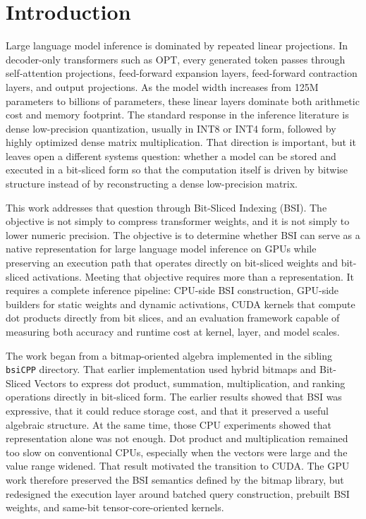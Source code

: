 \section{Introduction}\label{sec:introduction}
Large language model inference is dominated by repeated linear projections. In decoder-only transformers such as OPT, every generated token passes through self-attention projections, feed-forward expansion layers, feed-forward contraction layers, and output projections. As the model width increases from 125M parameters to billions of parameters, these linear layers dominate both arithmetic cost and memory footprint. The standard response in the inference literature is dense low-precision quantization, usually in INT8 or INT4 form, followed by highly optimized dense matrix multiplication. That direction is important, but it leaves open a different systems question: whether a model can be stored and executed in a bit-sliced form so that the computation itself is driven by bitwise structure instead of by reconstructing a dense low-precision matrix.

This work addresses that question through Bit-Sliced Indexing (BSI). The objective is not simply to compress transformer weights, and it is not simply to lower numeric precision. The objective is to determine whether BSI can serve as a native representation for large language model inference on GPUs while preserving an execution path that operates directly on bit-sliced weights and bit-sliced activations. Meeting that objective requires more than a representation. It requires a complete inference pipeline: CPU-side BSI construction, GPU-side builders for static weights and dynamic activations, CUDA kernels that compute dot products directly from bit slices, and an evaluation framework capable of measuring both accuracy and runtime cost at kernel, layer, and model scales.

The work began from a bitmap-oriented algebra implemented in the sibling \texttt{bsiCPP} directory. That earlier implementation used hybrid bitmaps and Bit-Sliced Vectors to express dot product, summation, multiplication, and ranking operations directly in bit-sliced form. The earlier results showed that BSI was expressive, that it could reduce storage cost, and that it preserved a useful algebraic structure. At the same time, those CPU experiments showed that representation alone was not enough. Dot product and multiplication remained too slow on conventional CPUs, especially when the vectors were large and the value range widened. That result motivated the transition to CUDA. The GPU work therefore preserved the BSI semantics defined by the bitmap library, but redesigned the execution layer around batched query construction, prebuilt BSI weights, and same-bit tensor-core-oriented kernels.

